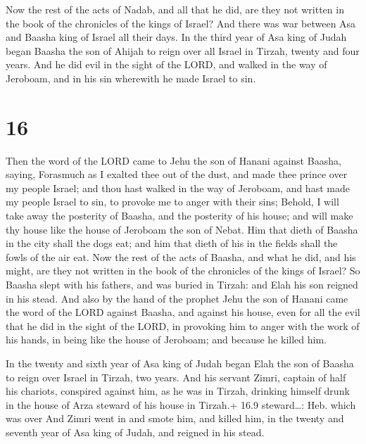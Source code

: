  Now the rest of the acts of Nadab, and all that he did,
are they not written in the book of the chronicles of the kings of
Israel?  And there was war between Asa and Baasha king of
Israel all their days.  In the third year of Asa king of
Judah began Baasha the son of Ahijah to reign over all Israel in Tirzah,
twenty and four years.  And he did evil in the sight of the
LORD, and walked in the way of Jeroboam, and in his sin wherewith he
made Israel to sin.

\hypertarget{section-15}{%
\section{16}\label{section-15}}

 Then the word of the LORD came to Jehu the son of Hanani
against Baasha, saying,  Forasmuch as I exalted thee out of
the dust, and made thee prince over my people Israel; and thou hast
walked in the way of Jeroboam, and hast made my people Israel to sin, to
provoke me to anger with their sins;  Behold, I will take
away the posterity of Baasha, and the posterity of his house; and will
make thy house like the house of Jeroboam the son of Nebat. 
Him that dieth of Baasha in the city shall the dogs eat; and him that
dieth of his in the fields shall the fowls of the air eat. 
Now the rest of the acts of Baasha, and what he did, and his might, are
they not written in the book of the chronicles of the kings of Israel?
 So Baasha slept with his fathers, and was buried in Tirzah:
and Elah his son reigned in his stead.  And also by the hand
of the prophet Jehu the son of Hanani came the word of the LORD against
Baasha, and against his house, even for all the evil that he did in the
sight of the LORD, in provoking him to anger with the work of his hands,
in being like the house of Jeroboam; and because he killed him.

 In the twenty and sixth year of Asa king of Judah began
Elah the son of Baasha to reign over Israel in Tirzah, two years.
 And his servant Zimri, captain of half his chariots,
conspired against him, as he was in Tirzah, drinking himself drunk in
the house of Arza steward of his house in Tirzah.+ 16.9 steward\ldots:
Heb. which was over  And Zimri went in and smote him, and
killed him, in the twenty and seventh year of Asa king of Judah, and
reigned in his stead.

